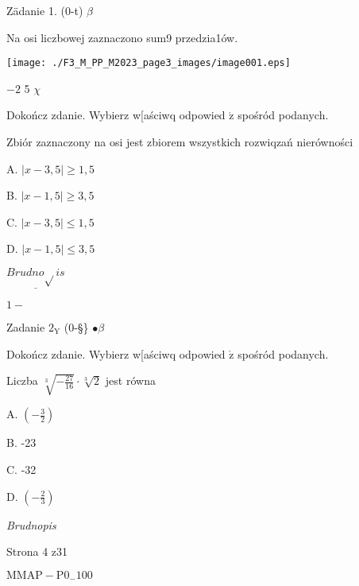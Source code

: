 \documentclass[a4paper,12pt]{article}
\begin{document}
Zädanie 1. (0-t) $\beta$

Na osi liczbowej zaznaczono sum9 przedzia1ów.
\begin{center}
\texttt{[image: ./F3\_M\_PP\_M2023\_page3\_images/image001.eps]}
\end{center}
$-2$  5  $\chi$

Dokończ zdanie. Wybierz w[aściwq odpowied $\acute{\mathrm{z}}$ spośród podanych.

Zbiór zaznaczony na osi jest zbiorem wszystkich rozwiqzań nierówności

A. $|x-3,5|\geq 1,5$

B. $|x-1,5|\geq 3,5$

C. $|x-3,5|\leq 1,5$

D. $|x-1,5|\leq 3,5$

$\underline{Brudno\sqrt{}is}$

$1 -$

Zadanie $2_{\mathrm{Y}}$ (0-\S\} $\bullet \beta$

Dokończ zdanie. Wybierz w[aściwq odpowied $\acute{\mathrm{z}}$ spośród podanych.

Liczba $\sqrt[3]{-\frac{27}{16}}\cdot\sqrt[3]{2}$ jest równa

A. $(-\displaystyle \frac{3}{2})$

B. -23

C. -32

D. $(-\displaystyle \frac{2}{3})$

{\it Brudnopis}

Strona 4 z31

$\mathrm{M}\mathrm{M}\mathrm{A}\mathrm{P}-\mathrm{P}0_{-}100$
\end{document}
